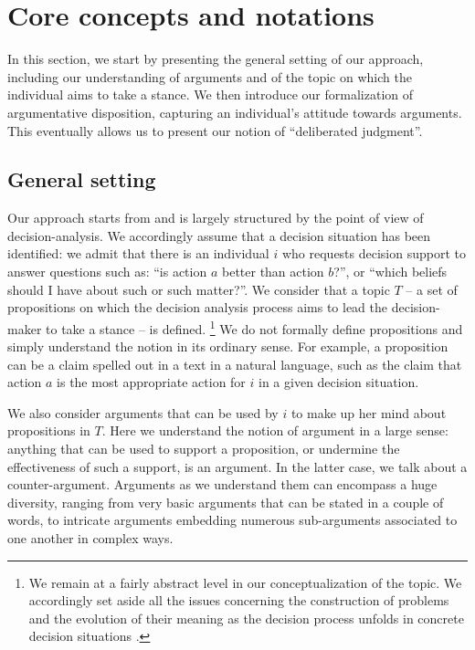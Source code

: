 \documentclass[version=3.21, pagesize, twoside=off, bibliography=totoc, DIV=calc, fontsize=12pt, a4paper]{scrartcl}
\begin{document}
\section{Core concepts and notations}
\label{sec:core}

In this section, we start by presenting the general setting of our approach, including our understanding of arguments and of the topic on which the individual aims to take a stance. We then introduce our formalization of argumentative disposition, capturing an individual's attitude towards arguments. This eventually allows us to present our notion of “deliberated judgment”.

\subsection{General setting}
Our approach starts from and is largely structured by the point of view of decision-analysis. We accordingly assume that a decision situation has been identified: we admit that there is an individual $i$ who requests decision support to answer questions such as: “is action $a$ better than action $b$?”, or “which beliefs should I have about such or such matter?”. We consider that a topic $T$ -- a set of propositions on which the decision analysis process aims to lead the decision-maker to take a stance -- is defined.%
\footnote{We remain at a fairly abstract level in our conceptualization of the topic. We accordingly set aside all the issues concerning the construction of problems and the evolution of their meaning as the decision process unfolds in concrete decision situations \citep{rosenhead_rational_2001}.}
We do not formally define propositions and simply understand the notion in its ordinary sense. For example, a proposition can be a claim spelled out in a text in a natural language, such as the claim that action $a$ is the most appropriate action for $i$ in a given decision situation.

We also consider arguments that can be used by $i$ to make up her mind about propositions in $T$. 
Here we understand the notion of argument in a large sense: anything that can be used to support a proposition, or undermine the effectiveness of such a support, is an argument. In the latter case, we talk about a counter-argument. Arguments as we understand them can encompass a huge diversity, ranging from very basic arguments that can be stated in a couple of words, to intricate arguments embedding numerous sub-arguments associated to one another in complex ways.
\end{document}
